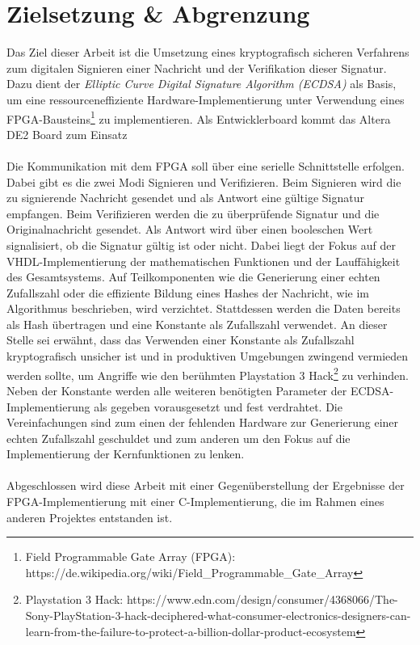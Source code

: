 
\chapter{Zielsetzung \& Abgrenzung} 
\label{sec:planung}
Das Ziel dieser Arbeit ist die Umsetzung eines kryptografisch sicheren Verfahrens zum digitalen Signieren einer Nachricht und der Verifikation dieser Signatur. Dazu dient der \textit{Elliptic Curve Digital Signature Algorithm (ECDSA)} als Basis, um eine ressourceneffiziente Hardware-Implementierung unter Verwendung eines FPGA-Bausteins\footnote{Field Programmable Gate Array (FPGA): https://de.wikipedia.org/wiki/Field\_Programmable\_Gate\_Array} zu implementieren. Als Entwicklerboard kommt das Altera DE2 Board zum Einsatz 
\\ \\
Die Kommunikation mit dem FPGA soll über eine serielle Schnittstelle erfolgen. Dabei gibt es die zwei Modi Signieren und Verifizieren. Beim Signieren wird die zu signierende Nachricht gesendet und als Antwort eine gültige Signatur empfangen. Beim Verifizieren werden die zu überprüfende Signatur und die Originalnachricht gesendet. Als Antwort wird über einen booleschen Wert signalisiert, ob die Signatur gültig ist oder nicht. Dabei liegt der Fokus auf der VHDL-Implementierung der mathematischen Funktionen und der Lauffähigkeit des Gesamtsystems. Auf Teilkomponenten wie die Generierung einer echten Zufallszahl oder die effiziente Bildung eines Hashes der Nachricht, wie im Algorithmus beschrieben, wird verzichtet. Stattdessen werden die Daten bereits als Hash übertragen und eine Konstante als Zufallszahl verwendet. An dieser Stelle sei erwähnt, dass das Verwenden einer Konstante als Zufallszahl kryptografisch unsicher ist und in produktiven Umgebungen zwingend vermieden werden sollte, um Angriffe wie den berühmten Playstation 3 Hack\footnote{Playstation 3 Hack: https://www.edn.com/design/consumer/4368066/The-Sony-PlayStation-3-hack-deciphered-what-consumer-electronics-designers-can-learn-from-the-failure-to-protect-a-billion-dollar-product-ecosystem} zu verhinden. Neben der Konstante werden alle weiteren benötigten Parameter der ECDSA-Implementierung als gegeben vorausgesetzt und fest verdrahtet. Die Vereinfachungen sind zum einen der fehlenden Hardware zur Generierung einer echten Zufallszahl geschuldet und zum anderen um den Fokus auf die Implementierung der Kernfunktionen zu lenken.  
\\ \\
Abgeschlossen wird diese Arbeit mit einer Gegenüberstellung der Ergebnisse der FPGA-Implementierung mit einer C-Implementierung, die im Rahmen eines anderen Projektes \cite{kewish} entstanden ist.


